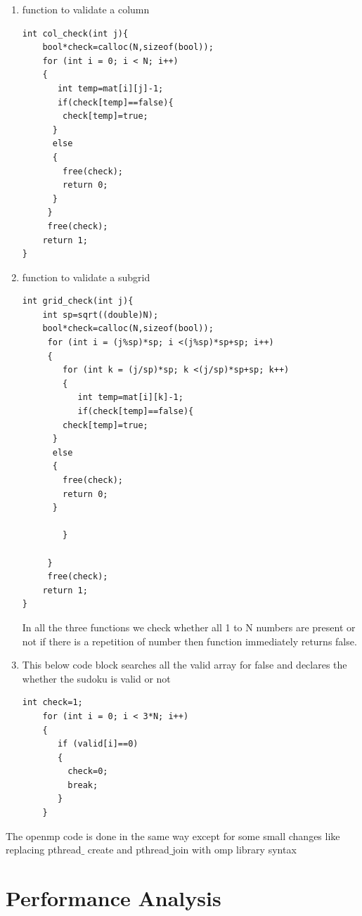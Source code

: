 \documentclass[10pt,a4paper]{article}
\begin{document}
\begin{enumerate}
\begin{lstlisting}[style=myStyle]
}
\end{lstlisting}
\item function to validate a column
\begin{lstlisting}[style=myStyle]
int col_check(int j){
    bool*check=calloc(N,sizeof(bool));
    for (int i = 0; i < N; i++)
    {
       int temp=mat[i][j]-1;
       if(check[temp]==false){
        check[temp]=true;
      }
      else
      {
        free(check);
        return 0;
      }
     }
     free(check);
    return 1;
}
\end{lstlisting}
\item function to validate a subgrid
\begin{lstlisting}[style=myStyle]
int grid_check(int j){
    int sp=sqrt((double)N);
    bool*check=calloc(N,sizeof(bool));
     for (int i = (j%sp)*sp; i <(j%sp)*sp+sp; i++)
     {
        for (int k = (j/sp)*sp; k <(j/sp)*sp+sp; k++)
        {
           int temp=mat[i][k]-1;
           if(check[temp]==false){
        check[temp]=true;
      }
      else
      {
        free(check);
        return 0;
      }
            
        }
        
     }
     free(check);
    return 1;
}
\end{lstlisting}

In all the three functions we check whether all 1 to N numbers are present or not if there is a repetition of number then function immediately returns false.

\item This below code block searches all the valid array for false 
and declares the whether the sudoku is valid or not
\begin{lstlisting}[style=myStyle]
int check=1;
    for (int i = 0; i < 3*N; i++)
    {
       if (valid[i]==0)
       {
         check=0;
         break;
       }
    }
\end{lstlisting}

\end{enumerate}
The openmp code is done in the same way except for some small changes like replacing pthread$\_$ create and pthread$\_$join with omp library syntax
\pagebreak
\section{Performance Analysis}
\end{document}
